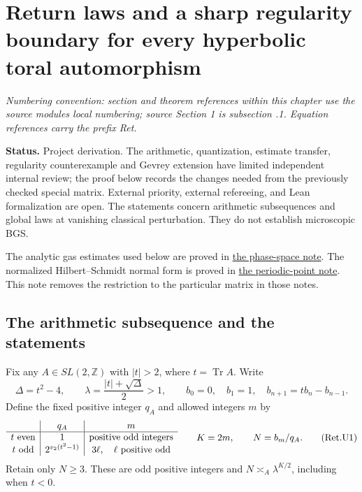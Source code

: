 \hypertarget{return-laws-and-a-sharp-regularity-boundary-for-every-hyperbolic-toral-automorphism}{%
\section{Return laws and a sharp regularity boundary for every hyperbolic toral automorphism}\label{return-laws-and-a-sharp-regularity-boundary-for-every-hyperbolic-toral-automorphism}}
\par\smallskip\noindent\emph{Numbering convention: section and theorem references within this chapter use the source module\textquotesingle s local numbering; source Section 1 is subsection \thesection.1. Equation references carry the prefix Ret.}\par\smallskip

\textbf{Status.} Project derivation. The arithmetic, quantization, estimate
transfer, regularity counterexample and Gevrey extension have limited
independent internal review; the proof below records the changes needed
from the previously checked special matrix.
External priority, external refereeing, and Lean formalization are open.
The statements concern arithmetic subsequences and global laws at
vanishing classical perturbation. They do not establish microscopic BGS.

The analytic gas estimates used below are proved in
\href{https://github.com/ChurilovMaksim/BGS/blob/main/mathematics/phase_space_return_gas.md}{the phase-space note}. The normalized
Hilbert--Schmidt normal form is proved in
\href{https://github.com/ChurilovMaksim/BGS/blob/main/mathematics/periodic_point_trace_comparison.md}{the periodic-point note}.
This note removes the restriction to the particular matrix in those notes.

\hypertarget{the-arithmetic-subsequence-and-the-statements}{%
\subsection{The arithmetic subsequence and the statements}\label{the-arithmetic-subsequence-and-the-statements}}

Fix any \(A\in SL(2,\mathbb Z)\) with \(|t|>2\), where \(t=\operatorname{Tr}A\).
Write
\[
 \Delta=t^2-4,\qquad
 \lambda=\frac{|t|+\sqrt\Delta}{2}>1,\qquad
 b_0=0,\quad b_1=1,\quad b_{n+1}=tb_n-b_{n-1}.
\]
Define the fixed positive integer \(q_A\) and allowed integers \(m\) by
\[
 \begin{array}{c|c|c}
 &q_A& m\\ \hline
 t\ {\rm even}&1&\text{positive odd integers}\\
 t\ {\rm odd}&2^{v_2(t^2-1)}&3\ell,\quad\ell\text{ positive odd}
 \end{array}
 \qquad K=2m,\qquad N=b_m/q_A.                            \tag{Ret.U1}
\]
Retain only \(N\ge3\). These are odd positive integers and
\(N\asymp_A\lambda^{K/2}\), including when \(t<0\).

